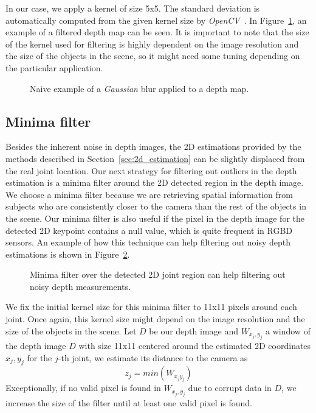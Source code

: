 In our case, we apply a kernel of size 5x5. The standard deviation is automatically computed from the given kernel size by \emph{OpenCV}~\cite{opencv_library}. In Figure~\ref{fig:gaussian_blur}, an example of a filtered depth map can be seen. It is important to note that the size of the kernel used for filtering is highly dependent on the image resolution and the size of the objects in the scene, so it might need some tuning depending on the particular application.

\begin{figure}[h]
    \centering
    
    \caption{Naive example of a \emph{Gaussian} blur applied to a depth map.}
    \label{fig:gaussian_blur}
\end{figure}

\subsection{Minima filter}\label{subsec:minima_filter}
Besides the inherent noise in depth images, the 2D estimations provided by the methods described in Section~\ref{sec:2d_estimation} can be slightly displaced from the real joint location. Our next strategy for filtering out outliers in the depth estimation is a minima filter around the 2D detected region in the depth image. We choose a minima filter because we are retrieving spatial information from subjects who are consistently closer to the camera than the rest of the objects in the scene. Our minima filter is also useful if the pixel in the depth image for the detected 2D keypoint contains a null value, which is quite frequent in RGBD sensors. An example of how this technique can help filtering out noisy depth estimations is shown in Figure~\ref{fig:minima_filter}.

\begin{figure}[h]
    \centering
    
    \caption{Minima filter over the detected 2D joint region can help filtering out noisy depth measurements.}
    \label{fig:minima_filter}
\end{figure}

We fix the initial kernel size for this minima filter to 11x11 pixels around each joint. Once again, this kernel size might depend on the image resolution and the size of the objects in the scene. Let \(D\) be our depth image and \(W_{x_j, y_j}\) a window of the depth image \(D\) with size 11x11 centered around the estimated 2D coordinates \(x_j, y_j\) for the $j$-th joint, we estimate its distance to the camera as
\begin{equation}
    z_j = min(W_{x_jy_j})
\end{equation}\label{eq:minima_filter}
Exceptionally, if no valid pixel is found in \(W_{x_j, y_j}\) due to corrupt data in \(D\), we increase the size of the filter until at least one valid pixel is found.

